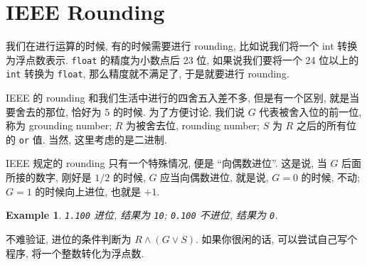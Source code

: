 \documentclass[12pt]{ctexart}
\theoremstyle{definition}
\theoremstyle{plain}
\newtheorem{exam}[definition]{Example}
\begin{document}
\section{IEEE Rounding}
我们在进行运算的时候, 有的时候需要进行 rounding, 比如说我们将一个 int 转换为浮点数表示. 
\verb|float| 的精度为小数点后 23 位, 如果说我们要将一个 24 位以上的 \verb|int| 转换为 \verb|float|, 
那么精度就不满足了, 于是就要进行 rounding. 

IEEE 的 rounding 和我们生活中进行的四舍五入差不多, 但是有一个区别, 就是当要舍去的那位, 恰好为 5 的时候. 
为了方便讨论, 我们说 \(G\) 代表被舍入位的前一位, 称为 grounding number; \(R\) 为被舍去位, rounding number; \(S\) 为 \(R\) 之后的所有位的 \verb|or| 值. 当然, 这里考虑的是二进制. 

IEEE 规定的 rounding 只有一个特殊情况, 便是 ``向偶数进位''. 这是说, 当 \(G\) 后面所接的数字, 刚好是 \(1/2\) 的时候, \(G\) 应当向偶数进位, 就是说, \(G = 0\) 的时候, 不动; \(G = 1\) 的时候向上进位, 也就是 \(+1\).  

\begin{exam}
\verb|1.100| 进位, 结果为 \verb|10|; \verb|0.100| 不进位, 结果为 \verb|0|. 
\end{exam}
不难验证, 进位的条件判断为 \(R \land (G \lor S)\). 如果你很闲的话, 可以尝试自己写个程序, 将一个整数转化为浮点数. 
\end{document}

